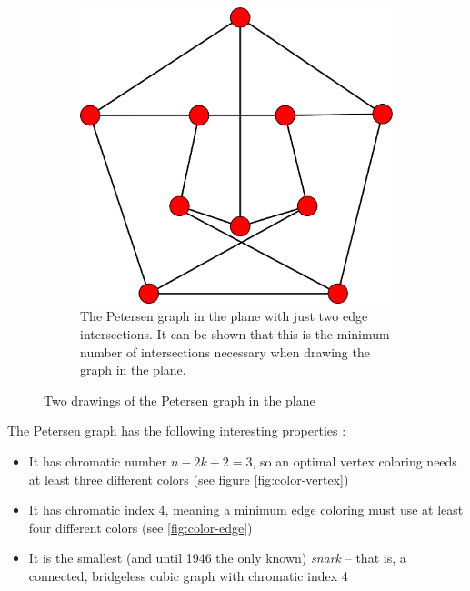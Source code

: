 \documentclass[11pt,            %
               a4paper,         %
               oneside,         %
               DIV12,           %
               fleqn,           %
               halfparskip,     %
               nochapterprefix, %
               bibtotocnumbered,%
              ]{scrartcl} %
\theoremstyle{definition}
\begin{document}
\begin{figure}[h]
\begin{subfigure}[t]{.45\textwidth}
    \includegraphics[keepaspectratio=true,width=\textwidth]{../planar-graphs/petersen-zweikreuzungen.pdf}
    \caption{The Petersen graph in the plane with just two edge
      intersections. It can be shown that this is the minimum number of
      intersections necessary when drawing the graph in the plane.}
    \label{fig:petersen-twointersect}
  \end{subfigure}
  \caption{Two drawings of the Petersen graph in the plane}
\end{figure}

The Petersen graph has the following interesting properties \cite{petersen}:

\begin{itemize}
  \item It has chromatic number $n - 2k + 2 = 3$, so an optimal vertex
    coloring needs at least three different colors (see figure
    \ref{fig:color-vertex})
  \item It has chromatic index 4, meaning a minimum edge coloring must
    use at least four different colors (see \ref{fig:color-edge})
  \item It is the smallest (and until 1946 the only known)
    \emph{snark} -- that is, a connected, bridgeless cubic graph with
    chromatic index 4
\end{itemize}
\end{document}
